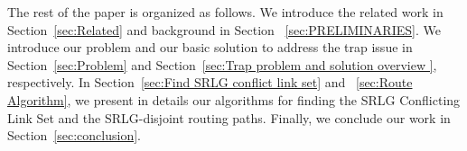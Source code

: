 The rest of the paper is organized as follows. We introduce the related work in Section~\ref{sec:Related} and background in Section ~\ref{sec:PRELIMINARIES}. We introduce our problem and our basic solution to address the trap issue in Section~\ref{sec:Problem} and Section~\ref{sec:Trap problem and solution overview }, respectively. In Section~\ref{sec:Find SRLG conflict link set} and ~\ref{sec:Route Algorithm}, we present in details our algorithms for finding the SRLG Conflicting Link Set and the SRLG-disjoint routing paths. Finally, we conclude our work in Section~\ref{sec:conclusion}.







